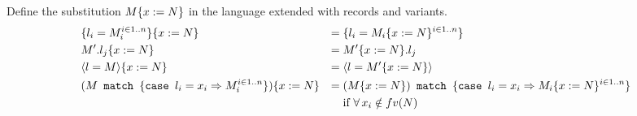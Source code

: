 \subsection{}

Define the substitution $M\{x:=N\}$ in the language extended with records and variants.
\begin{align*}
	 & \{l_i=M_i^{i \in 1..n}\}\{x:=N\}                     & =\; & \{l_i=M_i\{x:=N\}^{i \in 1..n}\}                                 \\
	 & M'.l_j\{x:=N\}                                  & =\; & M'\{x:=N\}.l_j                                              \\
	 & \langle l=M \rangle\{x:=N\}                                      & =\; & \langle l=M'\{x:=N\} \rangle                                                 \\
	 & (M\texttt{ match }\{\texttt{case }l_i = x_i \Rightarrow M_i^{i \in 1..n}\})\{x:=N\} & =\; & (M\{x:=N\})\texttt{ match }\{\texttt{case }l_i = x_i \Rightarrow M_i\{x:=N\}^{i \in 1..n}\} \\
	 &                                                            &     & \text{if }\forall\, x_i \notin fv(N)
\end{align*}
